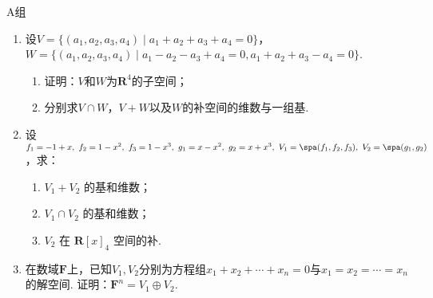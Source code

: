\centerline{\heiti A组}
\begin{enumerate}
    \item 设$V=\{(a_1,a_2,a_3,a_4) \mid a_1+a_2+a_3+a_4=0\}$，$W=\{(a_1,a_2,a_3,a_4) \mid a_1-a_2-a_3+a_4=0,a_1+a_2+a_3-a_4=0\}$.
          \begin{enumerate}
              \item 证明：$V$和$W$为$\mathbf{R}^4$的子空间；

              \item 分别求$V \cap W$，$V+W$以及$W$的补空间的维数与一组基.
          \end{enumerate}

    \item 设 $f_1=-1+x,\ f_2=1-x^2,\ f_3=1-x^3,\ g_1=x-x^2,\ g_2=x+x^3,\ V_1=\spa(f_1,f_2,f_3),\ V_2=\spa(g_1,g_2)$，求：
          \begin{enumerate}
              \item $V_1+V_2$ 的基和维数；

              \item $V_1 \cap V_2$ 的基和维数；

              \item $V_2$ 在 $\mathbf{R}[x]_4$ 空间的补.
          \end{enumerate}

    \item 在数域$\mathbf{F}$上，已知$V_1,V_2$分别为方程组$x_1+x_2+\cdots+x_n=0$与$x_1=x_2=\cdots=x_n$的解空间. 证明：$\mathbf{F}^n=V_1\oplus V_2$.
\end{enumerate}

